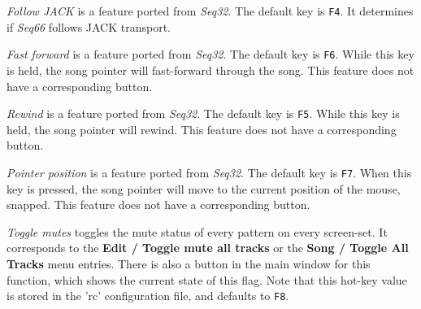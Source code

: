 %
%

   \textsl{Follow JACK} is a feature ported from \textsl{Seq32}.
   The default key is \texttt{F4}.
   It determines if \textsl{Seq66} follows JACK transport.

   \textsl{Fast forward} is a feature ported from \textsl{Seq32}.
   The default key is \texttt{F6}.
   While this key is held, the song pointer will fast-forward
   through the song.
   This feature does not have a corresponding button.

   \textsl{Rewind} is a feature ported from \textsl{Seq32}.
   The default key is \texttt{F5}.
   While this key is held, the song pointer will rewind.
   This feature does not have a corresponding button.

   \textsl{Pointer position} is a feature ported from \textsl{Seq32}.
   The default key is \texttt{F7}.
   When this key is pressed, the song pointer will move to the
   current position of the mouse, snapped.
   This feature does not have a corresponding button.

   \textsl{Toggle mutes} toggles the mute status of every
   pattern on every screen-set.  It corresponds to the
   \textbf{Edit / Toggle mute all tracks} or the 
   \textbf{Song / Toggle All Tracks}
   menu entries.  There is also a button in the main window for this function,
   which shows the current state of this flag.  Note that this
   hot-key value is stored in the 'rc' configuration file, and
   defaults to \texttt{F8}.


